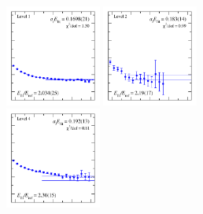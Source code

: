 \begin{figure}
  \includegraphics[width=0.28\textwidth]{figures/spectrum_a1gm/no_tq/fits/fit_1.pdf}
  \includegraphics[width=0.28\textwidth]{figures/spectrum_a1gm/no_tq/fits/fit_2.pdf}\\
  \includegraphics[width=0.28\textwidth]{figures/spectrum_a1gm/no_tq/fits/fit_5.pdf}

\end{figure}
